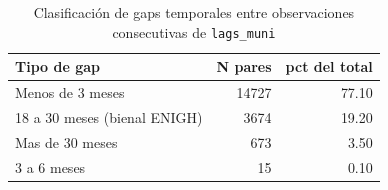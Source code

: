 \begin{table}[ht]
\centering
\caption{Clasificaci\'on de gaps temporales entre observaciones consecutivas de \texttt{lags\_muni}} 
\label{tab:13b_lags_tipo_gap}
\begin{tabular}{lrr}
  \toprule
Tipo de gap & N pares & pct del total \\ 
  \midrule
Menos de 3 meses & 14727 & 77.10 \\ 
  18 a 30 meses (bienal ENIGH) & 3674 & 19.20 \\ 
  Mas de 30 meses & 673 & 3.50 \\ 
  3 a 6 meses &  15 & 0.10 \\ 
   \bottomrule
\end{tabular}
\end{table}
